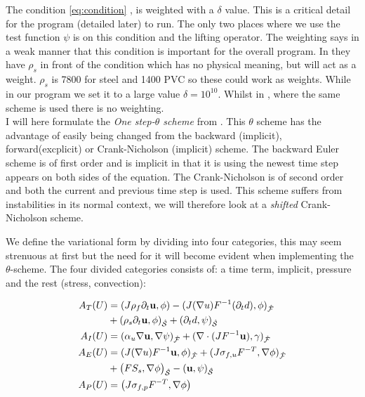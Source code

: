 The condition \eqref{eq:condition} , is weighted with a $\delta$ value. This is a critical detail for the program (detailed later) to run. The only two places where we use the test function $\psi$ is on this condition and the lifting operator. The weighting says in a weak manner that this condition is important for the overall program. In \cite{Wick} they have $\rho_s$ in front of the condition which has no physical meaning, but will act as a weight. $\rho_s$ is 7800 for steel and 1400 PVC \cite{Hron2006a} so these could work as weights. While in our program we set it to a large value $\delta = 10^{10}$. Whilst in \cite{Wick2011a}, where the same scheme is used there is no weighting. 
\\
I will here formulate the \textit{One step-$\theta$ scheme} from \cite{Wick2011}. This $\theta$ scheme has the advantage of easily being changed from the backward (implicit), forward(excplicit) or Crank-Nicholson (implicit) scheme. The backward Euler scheme is of first order and is implicit in that it is using the newest time step appears on both sides of the equation. The Crank-Nicholson is of second order and both the current and previous time step is used. This scheme suffers from instabilities in its normal context, we will therefore look at a \textit{shifted} Crank-Nicholson scheme. 

We define the variational form by dividing into four categories, this may seem strenuous at first but the need for it will become evident when implementing the $\theta$-scheme. The four divided categories consists of: a time term, implicit, pressure and the rest (stress, convection):

\begin{align}
A_T(U) &= (J \rho_f \partial_t \bold{u} , \phi ) - (J (\nabla u)F^{-1}(\partial_t d) , \phi )_{\mathcal{\hat{F}}} \\
	    & + (\rho_s \partial_t \bold{u} , \phi)_{\mathcal{\hat{S}}} + (\partial_t d , \psi)_{\mathcal{\hat{S}}}  \\
A_I(U) &= ( \alpha_u \nabla \bold{u}, \nabla \psi)_{\mathcal{\hat{F}}} + (\nabla \cdot (J F^{-1} \bold{u}), \gamma)_{\mathcal{\hat{F}}} \\
A_E(U) &= (J (\nabla u)F^{-1} \bold{u} , \phi )_{\mathcal{\hat{F}}} + ( J \sigma_{f,u} F^{-T} , \nabla \phi )_{\mathcal{\hat{F}}} \\
	    & + \big(F S_s, \nabla \phi \big)_{\mathcal{\hat{S}}} - ( \bold{u} , \psi )_{\mathcal{\hat{S}}} \\
A_P(U) &= \big( J \sigma_{f,p} F^{-T}, \nabla \phi  \big)  	 		
\end{align}

